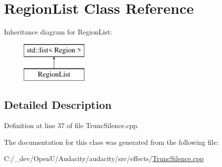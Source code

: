 \hypertarget{class_region_list}{}\section{Region\+List Class Reference}
\label{class_region_list}
Inheritance diagram for Region\+List\+:\begin{figure}[H]
\begin{center}
\leavevmode
\includegraphics[height=2.000000cm]{class_region_list}
\end{center}
\end{figure}


\subsection{Detailed Description}


Definition at line 37 of file Trunc\+Silence.\+cpp.



The documentation for this class was generated from the following file\+:\begin{DoxyCompactItemize}
\item 
C\+:/\+\_\+dev/\+Open\+U/\+Audacity/audacity/src/effects/\hyperlink{_trunc_silence_8cpp}{Trunc\+Silence.\+cpp}\end{DoxyCompactItemize}
